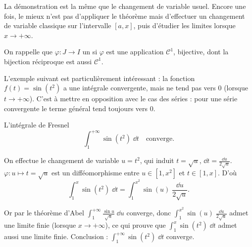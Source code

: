 \documentclass[class=report,crop=false]{standalone}
\begin{document}
La démonstration est la même que le changement de variable usuel.
Encore une fois, le mieux n'est pas d'appliquer le théorème mais 
d'effectuer un changement de variable classique sur l'intervalle $[a,x]$,
puis d'étudier les limites lorsque $x\to +\infty$.


On rappelle que $\varphi : J \to I$ un 
si $\varphi$ est une application $\mathcal{C}^1$, bijective, dont la bijection réciproque est
aussi $\mathcal{C}^1$.


\medskip 

L'exemple suivant est particulièrement intéressant :
la fonction $f(t) = \sin(t^2)$ a une intégrale convergente,
mais ne tend pas vers $0$ (lorsque $t\to+\infty$). 
C'est à mettre en opposition avec le cas des séries : 
pour une série convergente le terme général tend toujours vers $0$.

\begin{exemple}
L'intégrale de Fresnel 
$$\int_1^{+\infty} \sin (t^2) \; \dd t \quad \text{converge.}$$


On effectue le changement de variable $u=t^2$, qui induit 
$t=\sqrt{u}$,  $\dd t=\frac{\dd u}{2\sqrt u}$.
$\varphi : u \mapsto t = \sqrt{u}$ est un difféomorphisme 
  entre $u\in[1,x^2]$ et $t\in[1,x]$.
D'où
$$\int_1^x \sin (t^2) \; \dd t = \int_1^{x^2} \sin (u) \; \frac{\dd u}{2\sqrt u}.$$




Or par le théorème d'Abel $\int_1^{+\infty} \frac{\sin u}{\sqrt u} \; \dd u$
converge, donc $\int_1^{x^2} \sin (u) \; \frac{\dd u}{2\sqrt u}$ admet une limite finie (lorsque 
$x\to+\infty$), ce qui prouve que $\int_1^x \sin (t^2) \; \dd t$
admet aussi une limite finie. Conclusion : $\int_1^{+\infty} \sin (t^2) \; \dd t$ converge.



\end{exemple}
\end{document}
